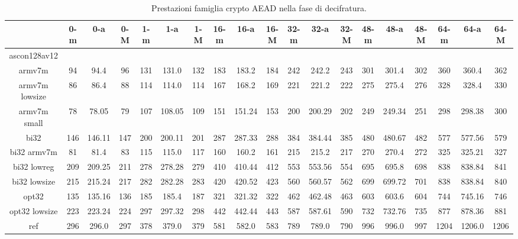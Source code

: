 \begin{landscape}
    \begin{table}[]
        \caption{Prestazioni famiglia crypto AEAD nella fase di decifratura.}
        \begin{adjustbox}{width=600pt}
            \centering
			\begin{tabular}{|c|c|c|c|c|c|c|c|c|c|c|c|c|c|c|c|c|c|c|}
				\hline
				& 0-m & 0-a & 0-M & 1-m & 1-a & 1-M & 16-m & 16-a & 16-M & 32-m & 32-a & 32-M & 48-m & 48-a & 48-M & 64-m & 64-a & 64-M \\
				\hline
				ascon128av12 & & & & & & & & & & & & & & & & & & \\
				\hline
				armv7m & 94 & 94.4 & 96 & 131 & 131.0 & 132 & 183 & 183.2 & 184 & 242 & 242.2 & 243 & 301 & 301.4 & 302 & 360 & 360.4 & 362 \\
				\hline
				armv7m lowsize & 86 & 86.4 & 88 & 114 & 114.0 & 114 & 167 & 168.2 & 169 & 221 & 221.2 & 222 & 275 & 275.4 & 276 & 328 & 328.4 & 330 \\
				\hline
				armv7m small & 78 & 78.05 & 79 & 107 & 108.05 & 109 & 151 & 151.24 & 153 & 200 & 200.29 & 202 & 249 & 249.34 & 251 & 298 & 298.38 & 300 \\
				\hline
				bi32 & 146 & 146.11 & 147 & 200 & 200.11 & 201 & 287 & 287.33 & 288 & 384 & 384.44 & 385 & 480 & 480.67 & 482 & 577 & 577.56 & 579 \\
				\hline
				bi32 armv7m & 81 & 81.4 & 83 & 115 & 115.0 & 117 & 160 & 160.2 & 161 & 215 & 215.2 & 217 & 270 & 270.4 & 272 & 325 & 325.21 & 327 \\
				\hline
				bi32 lowreg & 209 & 209.25 & 211 & 278 & 278.28 & 279 & 410 & 410.44 & 412 & 553 & 553.56 & 554 & 695 & 695.8 & 698 & 838 & 838.84 & 841 \\
				\hline
				bi32 lowsize & 215 & 215.24 & 217 & 282 & 282.28 & 283 & 420 & 420.52 & 423 & 560 & 560.57 & 562 & 699 & 699.72 & 701 & 838 & 838.84 & 840 \\
				\hline
				opt32 & 135 & 135.16 & 136 & 185 & 185.4 & 187 & 321 & 321.32 & 322 & 462 & 462.48 & 463 & 603 & 603.6 & 604 & 744 & 745.16 & 746 \\
				\hline
				opt32 lowsize & 223 & 223.24 & 224 & 297 & 297.32 & 298 & 442 & 442.44 & 443 & 587 & 587.61 & 590 & 732 & 732.76 & 735 & 877 & 878.36 & 881 \\
				\hline
				ref & 296 & 296.0 & 297 & 378 & 379.0 & 379 & 581 & 582.0 & 583 & 789 & 789.0 & 790 & 996 & 996.0 & 997 & 1204 & 1206.0 & 1206 \\
				\hline

\end{tabular}
\end{adjustbox}
\end{table}
\end{landscape}
